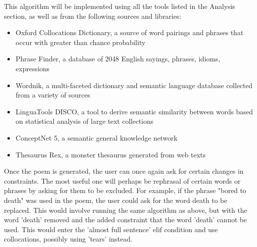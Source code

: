 This algorithm will be implemented using all the tools listed in the Analysis section, as well as from the following sources and libraries:
\begin{itemize}
\setlength{\itemsep}{0pt}
\item{Oxford Collocations Dictionary, a source of word pairings and phrases that occur with greater than chance probability}
\item{Phrase Finder, a database of 2048 English sayings, phrases, idioms, expressions}
\item{Wordnik, a multi-faceted dictionary and semantic language database collected from a variety of sources}
\item{LinguaTools DISCO, a tool to derive semantic similarity between words based on statistical analysis of large text collections}
\item{ConceptNet 5, a semantic general knowledge network}
\item{Thesaurus Rex, a monster thesaurus generated from web texts}
\end{itemize}

Once the poem is generated, the user can once again ask for certain changes in constraints. The most useful one will perhaps be rephrasal of certain words or phrases by asking for them to be excluded. For example, if the phrase "bored to death" was used in the poem, the user could ask for the word death to be replaced. This would involve running the same algorithm as above, but with the word 'death' removed and the added constraint that the word 'death' cannot be used. This would enter the 'almost full sentence' elif condition and use collocations, possibly using 'tears' instead.


